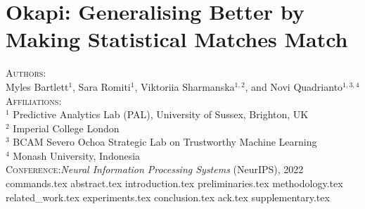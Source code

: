 \chapter{Okapi: Generalising Better by Making Statistical Matches Match}\label{ch:okapi}
\textsc{Authors}:\\
Myles Bartlett$^1$, Sara Romiti$^1$, Viktoriia Sharmanska$^{1,2}$, and Novi Quadrianto$^{1,3,4}$ \\
\textsc{Affiliations}:\\
$^1$ Predictive Analytics Lab (PAL), University of Sussex, Brighton, UK\\
$^2$ Imperial College London \\
$^3$ BCAM Severo Ochoa Strategic Lab on Trustworthy Machine Learning \\
$^4$ Monash University, Indonesia \\
\textsc{Conference}:\;\;\textit{Neural Information Processing Systems} (NeurIPS), 2022 \\
{commands.tex}
{abstract.tex}
{introduction.tex}
{preliminaries.tex}
{methodology.tex}
{related_work.tex}
{experiments.tex}
{conclusion.tex}
{ack.tex}
\newpage
\appendix
{supplementary.tex}
